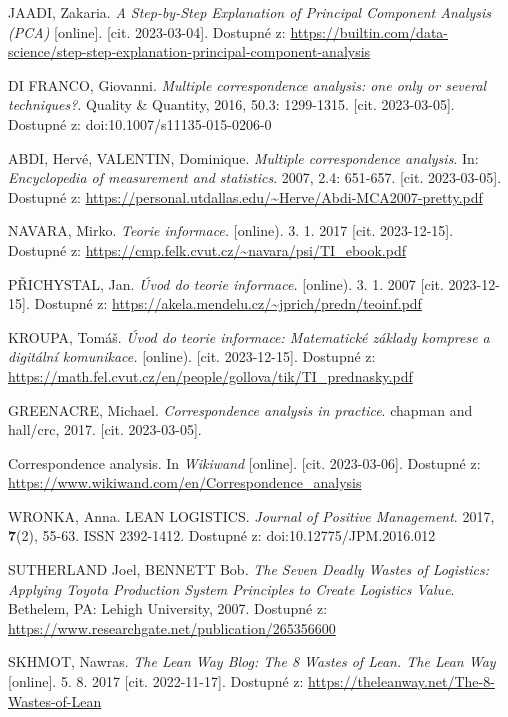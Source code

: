 \begin{thebibliography}{1}
JAADI, Zakaria. \textit{A Step-by-Step Explanation of Principal Component Analysis (PCA)
} [online].  [cit. 2023-03-04]. Dostupné z: \url{https://builtin.com/data-science/step-step-explanation-principal-component-analysis}

DI FRANCO, Giovanni. \textit{Multiple correspondence analysis: one only or several techniques?}. Quality \& Quantity, 2016, 50.3: 1299-1315. [cit. 2023-03-05]. Dostupné z: doi:10.1007/s11135-015-0206-0

ABDI, Hervé, VALENTIN, Dominique. \textit{Multiple correspondence analysis}. In: \textit{Encyclopedia of measurement and statistics}. 2007, 2.4: 651-657. [cit. 2023-03-05]. Dostupné z: \url{https://personal.utdallas.edu/\~Herve/Abdi-MCA2007-pretty.pdf}

NAVARA, Mirko. \textit{Teorie informace.} [online). 3. 1. 2017 [cit. 2023-12-15]. Dostupné z: \url{https://cmp.felk.cvut.cz/~navara/psi/TI_ebook.pdf}

PŘICHYSTAL, Jan. \textit{Úvod do teorie informace.} [online). 3. 1. 2007 [cit. 2023-12-15]. Dostupné z: \url{https://akela.mendelu.cz/~jprich/predn/teoinf.pdf}

KROUPA, Tomáš. \textit{Úvod do teorie informace: Matematické základy komprese a digitální komunikace.} [online). [cit. 2023-12-15]. Dostupné z: \url{https://math.fel.cvut.cz/en/people/gollova/tik/TI_prednasky.pdf}

GREENACRE, Michael. \textit{Correspondence analysis in practice}. chapman and hall/crc, 2017. [cit. 2023-03-05]. 

Correspondence analysis. In \textit{Wikiwand} [online]. [cit. 2023-03-06]. Dostupné z: \url{https://www.wikiwand.com/en/Correspondence\_analysis}

WRONKA, Anna. LEAN LOGISTICS. \textit{Journal of Positive Management}. 2017, \textbf{7}(2), 55-63. ISSN 2392-1412. Dostupné z: doi:10.12775/JPM.2016.012

SUTHERLAND Joel, BENNETT Bob. \textit{The Seven Deadly Wastes of Logistics: Applying Toyota Production System Principles to Create Logistics Value}. Bethelem, PA: Lehigh University, 2007. Dostupné z: \url{https://www.researchgate.net/publication/265356600}

SKHMOT, Nawras. \textit{The Lean Way Blog: The 8 Wastes of Lean. The Lean Way} [online]. 5. 8. 2017 [cit. 2022-11-17]. Dostupné z: \url{https://theleanway.net/The-8-Wastes-of-Lean}


\end{thebibliography}
